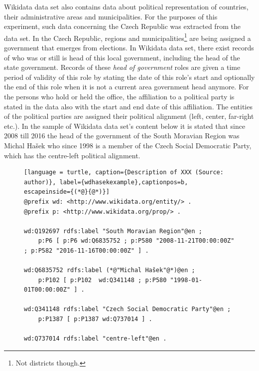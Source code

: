 Wikidata data set also contains data about political representation of countries, their administrative areas and municipalities. For the purposes of this experiment, such data concerning the Czech Republic was extracted from the data set. In the Czech Republic, regions and municipalities\footnote{Not districts though.} are being assigned a government that emerges from elections. In Wikidata data set, there exist records of who was or still is head of this local government, including the head of the state government. Records of these \textit{head of government} roles are given a time period of validity of this role by stating the date of this role's start and optionally the end of this role when it is not a current area government head anymore. For the persons who hold or held the office, the affiliation to a political party is stated in the data also with the start and end date of this affiliation. The entities of the political parties are assigned their political alignment (left, center, far-right etc.). In the sample of Wikidata data set's content below it is stated that since 2008 till 2016 the head of the government of the South Moravian Region was Michal Hašek who since 1998 is a member of the Czech Social Democratic Party, which has the centre-left political alignment.

\begin{figure}[h]
\begin{lstlisting}[language = turtle, caption={Description of XXX (Source: author)}, label={wdhasekexample},captionpos=b, escapeinside={(*@}{@*)}]
@prefix wd: <http://www.wikidata.org/entity/> .
@prefix p: <http://www.wikidata.org/prop/> .

wd:Q192697 rdfs:label "South Moravian Region"@en ;
    p:P6 [ p:P6 wd:Q6835752 ; p:P580 "2008-11-21T00:00:00Z" ; p:P582 "2016-11-16T00:00:00Z" ] .

wd:Q6835752 rdfs:label (*@"Michal Hašek"@*)@en ;
    p:P102 [ p:P102  wd:Q341148 ; p:P580 "1998-01-01T00:00:00Z" ] .

wd:Q341148 rdfs:label "Czech Social Democratic Party"@en ;
    p:P1387 [ p:P1387 wd:Q737014 ] .

wd:Q737014 rdfs:label "centre-left"@en .
\end{lstlisting}
\end{figure}

